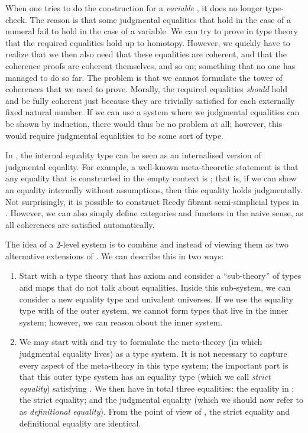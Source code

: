 \documentclass[a4paper,reqno]{amsart}
\theoremstyle{plain}
\theoremstyle{definition}
\begin{document}
When one tries to do the construction for a \emph{variable} , it does no longer type-check.
The reason is that some judgmental equalities that hold in the case of a numeral  fail to hold in the case of a variable.
We can try to prove in type theory that the required equalities hold up to homotopy.
However, we quickly have to realize that we then also need that these equalities are coherent, and that the coherence proofs are coherent themselves, and so on; something that no one has managed to do so far.
The problem is that we cannot formulate the tower of coherences that we need to prove. 
Morally, the required equalities \emph{should} hold and be fully coherent just because they are trivially satisfied for each externally fixed natural number.
If we can use a system where we judgmental equalities can be shown by induction, there would thus be no problem at all; however, this would require judgmental equalities to be some sort of type.

In , the internal equality type can be seen as an internalised version of judgmental equality.
For example, a well-known meta-theoretic statement is that any equality that is constructed in the empty context is ; that is, if we can show an equality internally without assumptions, then this equality holds judgmentally.
Not surprisingly, it is possible to construct Reedy fibrant semi-simplicial types in .
However, we can also simply define categories and functors in the naive sense, as all coherences are satisfied automatically.

The idea of a 2-level system is to combine  and  instead of viewing them as two alternative extensions of .
We can describe this in two ways:
\begin{enumerate}
 \item \label{item:firstKthenEmbed}
 Start with a type theory that has axiom  and consider a ``sub-theory'' of types and maps that do not talk about equalities. 
 Inside this sub-system, we can consider a new equality type and univalent universes. 
 If we use the equality type with  of the outer system, we cannot form types that live in the inner system; however, we can reason about the inner system.
 \item We may start with  and try to formulate the meta-theory (in which judgmental equality lives) as a type system.
 It is not necessary to capture every aspect of the meta-theory in this type system; the important part is that this outer type system has an equality type (which we call \emph{strict equality}) satisfying .
 We then have in total three equalities: the equality in ; the strict equality; and the judgmental equality (which we should now refer to as \emph{definitional equality}).
 From the point of view of , the strict equality and definitional equality are identical.
\end{enumerate}
\end{document}
